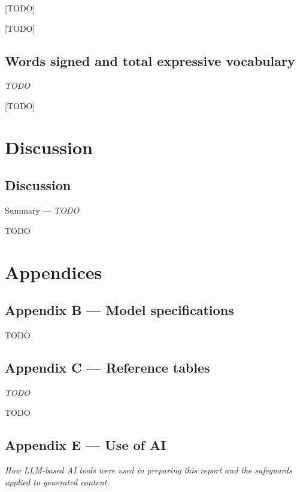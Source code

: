 \documentclass[
  11pt,
  a4paper,
]{report}
\begin{document}
{[}TODO{]}

\hfill\break

{[}TODO{]}

\chapter{Words signed and total expressive
vocabulary}\label{words-signed-and-total-expressive-vocabulary}

\emph{TODO}

\hfill\break

{[}TODO{]}

\part{Discussion}

\chapter{Discussion}\label{discussion-1}

Summary --- \emph{TODO}

\hfill\break

TODO

\part{Appendices}

\chapter{Appendix B --- Model
specifications}\label{appendix-b-model-specifications}

TODO

\hfill\break

\chapter{Appendix C --- Reference
tables}\label{appendix-c-reference-tables}

\emph{TODO}

\hfill\break

TODO

\chapter{Appendix E --- Use of AI}\label{appendix-e-use-of-ai}

\emph{How LLM-based AI tools were used in preparing this report and the
safeguards applied to generated content.}
\end{document}
